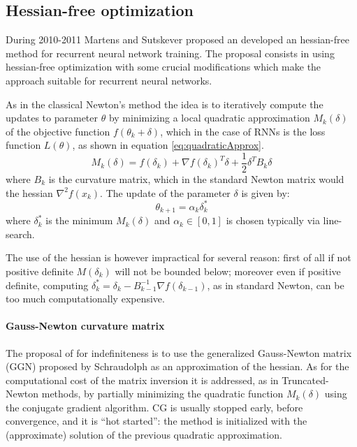 \subsection{Hessian-free optimization}

During 2010-2011 Martens and Sutskever\cite{hessianFree} proposed an developed an hessian-free method for recurrent neural network training.
The proposal consists in using hessian-free optimization with some crucial modifications which make the approach suitable for recurrent neural networks.

As in  the classical Newton's method the idea is to iteratively compute the updates to parameter $\theta$ by minimizing a local quadratic approximation $M_{k}(\delta)$ of the objective function $f(\theta_k +\delta)$, which in the case of RNNs is the loss function $L(\theta)$, as shown in equation \ref{eq:quadraticApprox}.
\begin{equation}
 M_{k}(\delta) = f(\delta_{k})+\nabla f(\delta_{k})^T \delta +\frac{1}{2}\delta^T B_{k}\delta
 \label{eq:quadraticApprox}
\end{equation}
where $B_k$ is the curvature matrix, which in the standard Newton matrix would the hessian $\nabla^2f(x_k)$.
The update of the parameter $\delta$ is given by:
\begin{equation}
 \theta_{k+1} = \alpha_k\delta_k^* 
\end{equation}
where $\delta_k^*$ is the minimum $M_k(\delta)$ and $\alpha_k\in[0,1]$ is chosen typically via line-search. 

The use of the hessian is however impractical for several reason: first of all if not positive definite $M(\delta_k)$ will not be bounded below; moreover even if positive definite, computing $\delta_k^* = \delta_k - B_{k-1}^{-1}\nabla f(\delta_{k-1})$, as in standard Newton, can be too much computationally expensive.

\paragraph{Gauss-Newton curvature matrix}
The proposal of \cite{hessianFree} for indefiniteness is to use the generalized Gauss-Newton matrix (GGN) proposed by Schraudolph\cite{gaussNewtonMatrix} as an approximation of the hessian. As for the computational cost of the matrix inversion it is addressed, as in Truncated-Newton methods, by partially minimizing the quadratic function $M_{k}(\delta)$ using the conjugate gradient algorithm. CG is usually stopped early, before convergence, and it is ``hot started'': the method is initialized with the (approximate) solution of the previous quadratic approximation.

